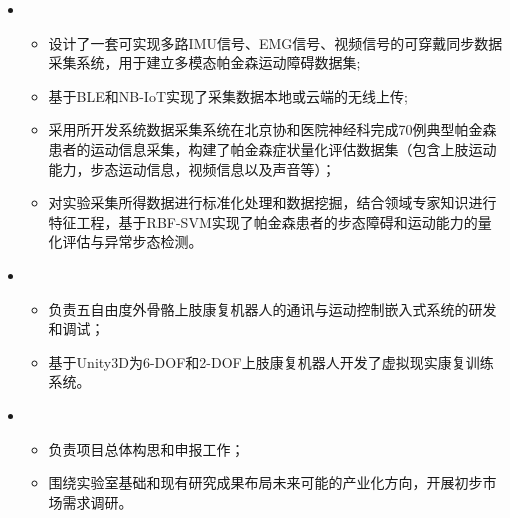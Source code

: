 \begin{itemize}[leftmargin=*]
    \item {}
    {\small
    \begin{itemize}
      \item 设计了一套可实现多路IMU信号、EMG信号、视频信号的可穿戴同步数据采集系统，用于建立多模态帕金森运动障碍数据集;
      \item 基于BLE和NB-IoT实现了采集数据本地或云端的无线上传;
      \item 采用所开发系统数据采集系统在北京协和医院神经科完成70例典型帕金森患者的运动信息采集，构建了帕金森症状量化评估数据集（包含上肢运动能力，步态运动信息，视频信息以及声音等）；
      \item 对实验采集所得数据进行标准化处理和数据挖掘，结合领域专家知识进行特征工程，基于RBF-SVM实现了帕金森患者的步态障碍和运动能力的量化评估与异常步态检测。
    \end{itemize}
    }
    \item {}
    {\small
    \begin{itemize}
      \item 负责五自由度外骨骼上肢康复机器人的通讯与运动控制嵌入式系统的研发和调试；
      \item 基于Unity3D为6-DOF和2-DOF上肢康复机器人开发了虚拟现实康复训练系统。
    \end{itemize}
    }
    \item {}
    {\small
    \begin{itemize}
      \item 负责项目总体构思和申报工作；
      \item 围绕实验室基础和现有研究成果布局未来可能的产业化方向，开展初步市场需求调研。
    \end{itemize}
    }
  \end{itemize}

